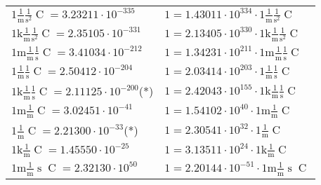 \begin{center}
\begin{longtable}{l l}
{\color{black}$1 \bm{\mathrm{ }}\frac1{\operatorname{m}}\frac1{\operatorname{s}^2}{\operatorname{C}}{} = 3.23211\cdot10^{-335} $}   & {\color{black}$ 1 = 1.43011\cdot10^{334} \cdot 1 \bm{\mathrm{ }}\frac1{\operatorname{m}}\frac1{\operatorname{s}^2}{\operatorname{C}}{}$}  \\
{\color{gray}$1 \bm{\mathrm{ k}}\frac1{\operatorname{m}}\frac1{\operatorname{s}^2}{\operatorname{C}}{} = 2.35105\cdot10^{-331} $}   & {\color{gray}$ 1 = 2.13405\cdot10^{330} \cdot 1 \bm{\mathrm{ k}}\frac1{\operatorname{m}}\frac1{\operatorname{s}^2}{\operatorname{C}}{}$}  \\
{\color{gray}$1 \bm{\mathrm{ m}}\frac1{\operatorname{m}}\frac1{\operatorname{s}}{\operatorname{C}}{} = 3.41034\cdot10^{-212} $}   & {\color{gray}$ 1 = 1.34231\cdot10^{211} \cdot 1 \bm{\mathrm{ m}}\frac1{\operatorname{m}}\frac1{\operatorname{s}}{\operatorname{C}}{}$}  \\
{\color{black}$1 \bm{\mathrm{ }}\frac1{\operatorname{m}}\frac1{\operatorname{s}}{\operatorname{C}}{} = 2.50412\cdot10^{-204} $}   & {\color{black}$ 1 = 2.03414\cdot10^{203} \cdot 1 \bm{\mathrm{ }}\frac1{\operatorname{m}}\frac1{\operatorname{s}}{\operatorname{C}}{}$}  \\
{\color{gray}$1 \bm{\mathrm{ k}}\frac1{\operatorname{m}}\frac1{\operatorname{s}}{\operatorname{C}}{} = 2.11125\cdot10^{-200} $}\quad(*) & {\color{gray}$ 1 = 2.42043\cdot10^{155} \cdot 1 \bm{\mathrm{ k}}\frac1{\operatorname{m}}\frac1{\operatorname{s}}{\operatorname{C}}{}$}  \\
{\color{gray}$1 \bm{\mathrm{ m}}\frac1{\operatorname{m}}{}{\operatorname{C}}{} = 3.02451\cdot10^{-41} $}   & {\color{gray}$ 1 = 1.54102\cdot10^{40} \cdot 1 \bm{\mathrm{ m}}\frac1{\operatorname{m}}{}{\operatorname{C}}{}$}  \\
{\color{black}$1 \bm{\mathrm{ }}\frac1{\operatorname{m}}{}{\operatorname{C}}{} = 2.21300\cdot10^{-33} $}\quad(*) & {\color{black}$ 1 = 2.30541\cdot10^{32} \cdot 1 \bm{\mathrm{ }}\frac1{\operatorname{m}}{}{\operatorname{C}}{}$}  \\
{\color{gray}$1 \bm{\mathrm{ k}}\frac1{\operatorname{m}}{}{\operatorname{C}}{} = 1.45550\cdot10^{-25} $}   & {\color{gray}$ 1 = 3.13511\cdot10^{24} \cdot 1 \bm{\mathrm{ k}}\frac1{\operatorname{m}}{}{\operatorname{C}}{}$}  \\
{\color{gray}$1 \bm{\mathrm{ m}}\frac1{\operatorname{m}}{\operatorname{s}}{\operatorname{C}}{} = 2.32130\cdot10^{50} $}   & {\color{gray}$ 1 = 2.20144\cdot10^{-51} \cdot 1 \bm{\mathrm{ m}}\frac1{\operatorname{m}}{\operatorname{s}}{\operatorname{C}}{}$}  \\

\end{longtable}
\end{center}
